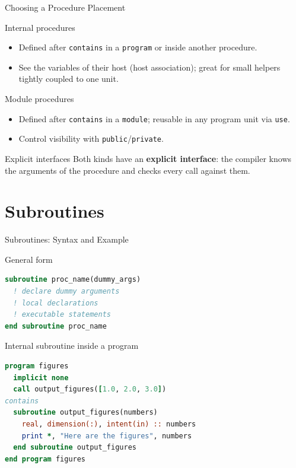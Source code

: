 \begin{frame}{Choosing a Procedure Placement}
  \begin{block}{Internal procedures}
    \begin{itemize}
      \item Defined after \texttt{contains} in a \texttt{program} or inside another procedure.
      \item See the variables of their host (host association); great for small helpers tightly coupled to one unit.
    \end{itemize}
  \end{block}
  \begin{block}{Module procedures}
    \begin{itemize}
      \item Defined after \texttt{contains} in a \texttt{module}; reusable in any program unit via \texttt{use}.
      \item Control visibility with \texttt{public}/\texttt{private}.
    \end{itemize}
  \end{block}
  \begin{block}{Explicit interfaces}
    Both kinds have an \textbf{explicit interface}: the compiler knows the arguments of the procedure and checks every call against them.
  \end{block}
\end{frame}


\section{Subroutines}

\begin{frame}[fragile]{Subroutines: Syntax and Example}
  \begin{block}{General form}
\begin{lstlisting}[language=Fortran]
subroutine proc_name(dummy_args)
  ! declare dummy arguments
  ! local declarations
  ! executable statements
end subroutine proc_name
\end{lstlisting}
  \end{block}
  \begin{block}{Internal subroutine inside a program}
\begin{lstlisting}[language=Fortran]
program figures
  implicit none
  call output_figures([1.0, 2.0, 3.0])
contains
  subroutine output_figures(numbers)
    real, dimension(:), intent(in) :: numbers
    print *, "Here are the figures", numbers
  end subroutine output_figures
end program figures
\end{lstlisting}
  \end{block}
\end{frame}

